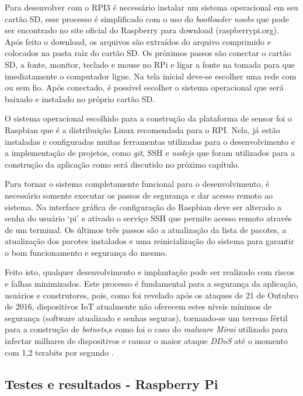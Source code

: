 Para desenvolver com o RPI3 é necessário instalar um sistema operacional
em seu cartão SD, esse processo é simplificado com o uso do \emph{bootloader noobs}
que pode ser encontrado no site oficial do Raspberry para download (raspberrypi.org). Após
feito o download, os arquivos são extraídos do arquivo comprimido e colocados na
pasta raiz do cartão SD. Os próximos passos são conectar o cartão SD, a fonte,
monitor, teclado e mouse no RPi e ligar a fonte na tomada
para que imediatamente o computador ligue. Na tela inicial deve-se escolher uma rede com ou sem fio.
Após conectado, é possível escolher o sistema operacional que será baixado e instalado no próprio cartão SD.

O sistema operacional escolhido para a construção da plataforma de sensor foi o
Raspbian que é a distribuição Linux recomendada para o RPI. Nela, já estão
instaladas e configuradas muitas ferramentas utilizadas para o desenvolvimento e
	a implementação de projetos, como \emph{git}, SSH e \emph{nodejs} que foram utilizados para a
construção da aplicação como será discutido no próximo capítulo.

Para tornar o sistema completamente funcional para o desenvolvimento, é
necessário somente executar os passos de segurança e dar acesso remoto
ao sistema. Na interface gráfica de configuração do Raspbian deve ser alterado
a senha do usuário ‘pi’ e ativado o serviço SSH que permite acesso remoto através
de um terminal. Os últimos três passos são a atualização da lista de pacotes,
a atualização dos pacotes instalados e uma reinicialização do sistema para
garantir o bom funcionamento e segurança do mesmo.

Feito isto, qualquer desenvolvimento e implantação pode ser realizado com riscos
e falhas minimizados. Este processo é fundamental para a segurança da aplicação,
usuários e construtores, pois, como foi revelado após os ataques de 21 de Outubro
de 2016, dispositivos IoT atualmente não oferecem estes níveis mínimos de
segurança (software atualizado e senhas seguras), tornando-se um terreno
fértil para a construção de \emph{botnets},s como foi o caso do \emph{malware
Mirai} utilizado para infectar milhares de dispositivos e causar o maior ataque
\emph{DDoS} até o momento com 1,2 terabits por segundo
\cite{guardianMirai} \cite{nytimesMirai}.


\subsection{Testes e resultados - Raspberry Pi}
\label{subsec:testes-rpi}

